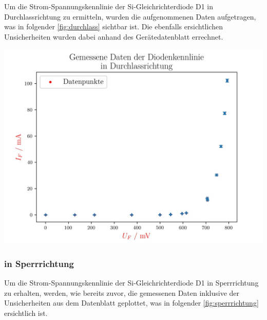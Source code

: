 \documentclass[11pt,ngerman]{scrartcl}
\begin{document}
Um die Strom-Spannungskennlinie der Si-Gleichrichterdiode D1 in
Durchlassrichtung zu ermitteln, wurden die aufgenommenen Daten aufgetragen, was
in folgender \autoref{fig:durchlass} sichtbar ist. Die ebenfalls ersichtlichen
Unsicherheiten wurden dabei anhand des Gerätedatenblatt errechnet. \cite{1n4007}


\begin{center}
	\begin{minipage}[t]{0.8\textwidth}
		\includegraphics[width=\textwidth]{./figures/halbleiter/Versuch1/durchlass_error}
		\label{fig:durchlass}
	\end{minipage}
\end{center}

\newpage

\subsubsection{in Sperrrichtung}
Um die Strom-Spannungskennlinie der Si-Gleichrichterdiode D1 in Sperrrichtung zu erhalten, werden, wie bereits zuvor, die gemessenen Daten inklusive der Unsicherheiten aus dem Datenblatt geplottet, was in folgender \autoref{fig:sperrrichtung} ersichtlich ist.
\end{document}

